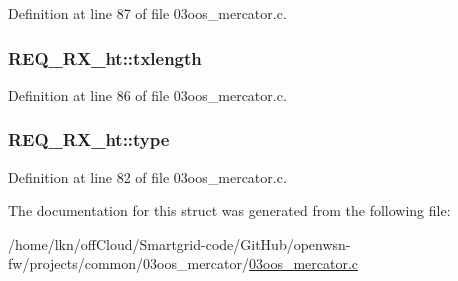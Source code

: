 Definition at line 87 of file 03oos\+\_\+mercator.\+c.

\subsubsection[{\texorpdfstring{txlength}{txlength}}]{ R\+E\+Q\+\_\+\+R\+X\+\_\+ht\+::txlength}\hypertarget{struct_r_e_q___r_x__ht_a44ff0343f6c1dd6fa128f4b57ec7fcb0}{}\label{struct_r_e_q___r_x__ht_a44ff0343f6c1dd6fa128f4b57ec7fcb0}


Definition at line 86 of file 03oos\+\_\+mercator.\+c.

\subsubsection[{\texorpdfstring{type}{type}}]{ R\+E\+Q\+\_\+\+R\+X\+\_\+ht\+::type}\hypertarget{struct_r_e_q___r_x__ht_a384a121770156e4df291c738128e62fe}{}\label{struct_r_e_q___r_x__ht_a384a121770156e4df291c738128e62fe}


Definition at line 82 of file 03oos\+\_\+mercator.\+c.



The documentation for this struct was generated from the following file\+:\begin{DoxyCompactItemize}
\item 
/home/lkn/off\+Cloud/\+Smartgrid-\/code/\+Git\+Hub/openwsn-\/fw/projects/common/03oos\+\_\+mercator/\hyperlink{03oos__mercator_8c}{03oos\+\_\+mercator.\+c}\end{DoxyCompactItemize}
